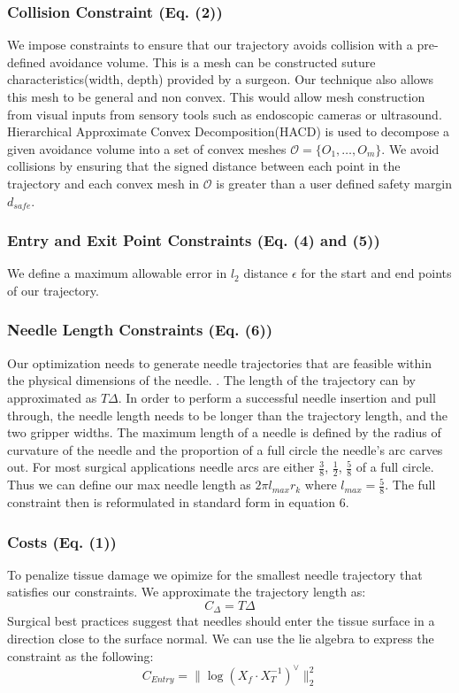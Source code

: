\documentclass[0-suturing.tex]{subfiles}
\begin{document}
\subsubsection{Collision Constraint (Eq. (2))}
We impose constraints to ensure that our trajectory avoids collision with a pre-defined avoidance volume.
This is a mesh can be constructed suture characteristics(width, depth) provided by a surgeon. Our technique
also allows this mesh to be general and non convex. This would allow mesh construction from visual inputs from sensory tools such as endoscopic cameras or ultrasound.  Hierarchical Approximate Convex Decomposition(HACD)  is used to decompose a given avoidance volume into a set of convex meshes 
$\mathcal{O} = \{O_1, \ldots, O_m\}$. We avoid collisions by ensuring that the signed distance between each 
point in the trajectory and each convex mesh in $\mathcal{O}$ is greater than a user defined safety margin $d_{safe}$. 


\subsubsection{Entry and Exit Point Constraints (Eq. (4) and (5))}
We define a maximum allowable error in $l_2$ distance $\epsilon$ for the start and end points of our trajectory.


\subsubsection{Needle Length Constraints (Eq. (6)) }
Our optimization needs to generate needle trajectories that are feasible within the physical dimensions of the needle. . 
The length of the trajectory can by approximated as $T\Delta$. In order to perform a successful needle insertion and pull through, the needle length needs to be longer than the trajectory length, and the two gripper widths. 
The maximum length of a needle is defined by the radius of curvature of the needle and the proportion of a full circle the needle's arc carves out. 
For most surgical applications needle arcs are either $\frac{3}{8}$, $\frac{1}{2}$, $\frac{5}{8}$ of a full circle. 
Thus we can define our max needle length as $2 \pi l_{max}r_k$ where $l_{max} = \frac{5}{8}$.
The full constraint then is reformulated in standard form in equation 6.


\subsubsection{Costs (Eq. (1))}
To penalize tissue damage we opimize for the smallest needle trajectory that satisfies our constraints.
We approximate the trajectory length as:
\begin{equation}
    C_{\Delta} = T\Delta 
\end{equation}
Surgical best practices suggest that needles should enter the tissue surface in a direction close to the surface normal.
We can use the lie algebra to express the constraint as the following:
\begin{equation}
    C_{Entry} = \|\log(X_f \cdot X_T^{-1})^{\vee}\|^2_2
\end{equation}
\end{document}
